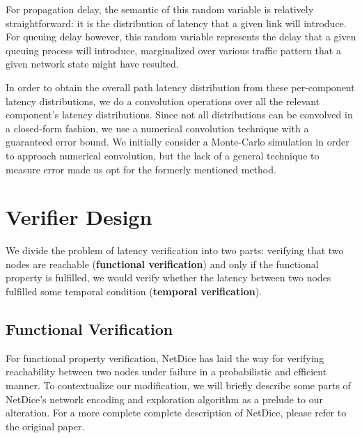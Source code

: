 \documentclass[10pt,sigconf,letterpaper,anonymous,nonacm]{acmart}
\begin{document}
For propagation delay, the semantic of this random variable is relatively straightforward: it is 
the distribution of latency that a given link will introduce.
For queuing delay however, this random variable represents the delay that a given queuing process 
will introduce, marginalized over various traffic pattern that a given network state might have 
resulted.

In order to obtain the overall path latency distribution from these per-component latency 
distributions, we do a convolution operations over all the relevant component's latency 
distributions.
Since not all distributions can be convolved in a closed-form fashion, we use a numerical 
convolution technique with a guaranteed error bound. 
We initially consider a Monte-Carlo simulation in order to approach numerical convolution, but 
the lack of a general technique to measure error made us opt for the formerly mentioned method.


\section{Verifier Design}
We divide the problem of latency verification into two parts: 
verifying that two nodes are reachable (\textbf{functional verification}) and only if 
the functional property is fulfilled, we would verify whether the latency between 
two nodes fulfilled some temporal condition (\textbf{temporal verification}).

\subsection{Functional Verification}
For functional property verification, NetDice \cite{steffen2020probabilistic} 
has laid the way for verifying reachability between two nodes under failure in a 
probabilistic and efficient manner.
To contextualize our modification, we will briefly describe some parts of 
NetDice's network encoding and exploration algorithm as a prelude to our alteration.
For a more complete complete description of NetDice, please refer to the original 
paper.
\end{document}

